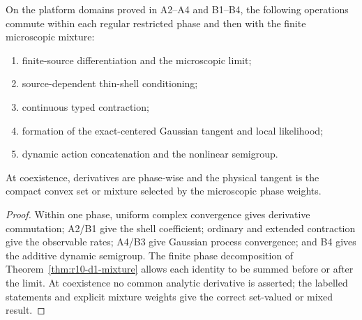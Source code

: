 \begin{theorem}
\label{thm:r10-d1-main}
On the platform domains proved in A2--A4 and B1--B4, the following operations
commute within each regular restricted phase and then with the finite
microscopic mixture:
\begin{enumerate}[label=(\roman*)]
\item finite-source differentiation and the microscopic limit;
\item source-dependent thin-shell conditioning;
\item continuous typed contraction;
\item formation of the exact-centered Gaussian tangent and local likelihood;
\item dynamic action concatenation and the nonlinear semigroup.
\end{enumerate}
At coexistence, derivatives are phase-wise and the physical tangent is the
compact convex set or mixture selected by the microscopic phase weights.
\end{theorem}

\begin{proof}
Within one phase, uniform complex convergence gives derivative commutation;
A2/B1 give the shell coefficient; ordinary and extended contraction give the
observable rates; A4/B3 give Gaussian process convergence; and B4 gives the
additive dynamic semigroup.  The finite phase decomposition of
Theorem~\ref{thm:r10-d1-mixture} allows each identity to be summed before or
after the limit.  At coexistence no common analytic derivative is asserted;
the labelled statements and explicit mixture weights give the correct
set-valued or mixed result.
\end{proof}
